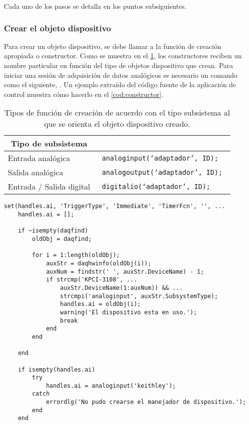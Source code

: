 Cada uno de los pasos se detalla en los puntos subsiguientes.


\subsubsection{Crear el objeto dispositivo}

Para crear un objeto dispositivo, se debe llamar a la función de creación apropiada o constructor. Como se muestra en el \cref{tab:constructors}, los constructores reciben un nombre particular en función del tipo de objetos dispositivo que crean. Para iniciar una sesión de adquisición de datos analógicos es necesario un comando como el siguiente, . Un ejemplo extraído del código fuente de la aplicación de control muestra cómo hacerlo en el \cref{cod:constructor}.\par

\begin{table}
	\centering
	\begin{tabular}{l >{\tt}l}
		\toprule
		\multicolumn{1}{c}{Tipo de subsistema} & \multicolumn{1}{c}{\rm Constructor} \\
		\midrule
		Entrada analógica & analoginput(`adaptador', ID); \\
		\midrule
		Salida analógica & analogoutput(`adaptador', ID); \\
		\midrule
		Entrada / Salida digital & digitalio(`adaptador', ID); \\
		\bottomrule
	\end{tabular}
	\caption[Tipos de constructor en función del objeto dispositivo creado]{Tipos de función de creación de acuerdo con el tipo subsistema al que se orienta el objeto dispositivo creado.}
	\label{tab:constructors}
\end{table}

\begin{lstlisting}[style=displayed, caption={[Método a seguir para crear un objeto dispositivo]{Método que evalúa la existencia de un objeto dispositivo previo a la llamada de la aplicación, en caso positivo lo hereda para su uso posterior, de lo contrario crea uno nuevo.}}, label={cod:constructor}]
	set(handles.ai, 'TriggerType', 'Immediate', 'TimerFcn', '', ...
	handles.ai = [];

	if ~isempty(daqfind)
		oldObj = daqfind;

		for i = 1:length(oldObj);
			auxStr = daqhwinfo(oldObj(i));
			auxNum = findstr(' ', auxStr.DeviceName) - 1;
			if strcmp('KPCI-3108', ...
				auxStr.DeviceName(1:auxNum)) && ...
				strcmpi('analoginput', auxStr.SubsystemType);
				handles.ai = oldObj(i);
				warning('El dispositivo esta en uso.');
				break
			end
		end

	end

	if isempty(handles.ai)
		try
			handles.ai = analoginput('keithley');
		catch
			errordlg('No pudo crearse el manejador de dispositivo.');
		end
	end
\end{lstlisting}

